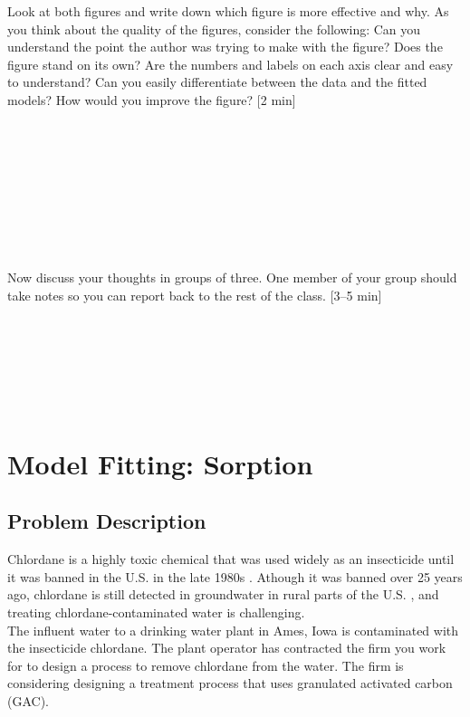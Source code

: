 \documentclass[12pt,letterpaper]{article}
\begin{document}
Look at both figures and write down which figure is more effective and why. As you think about the quality of the figures, consider the following: Can you understand the point the author was trying to make with the figure? Does the figure stand on its own?  Are the numbers and labels on each axis clear and easy to understand?  Can you easily differentiate between the data and the fitted models? How would you improve the figure? [2 min]\\\\\\\\\\\\\\\\\\\\

Now discuss your thoughts in groups of three. One member of your group should take notes so you can report back to the rest of the class. [3--5 min] \\\\\\\\\\\\\\

\section *{Model Fitting: Sorption}

\subsection *{Problem Description}
Chlordane is a highly toxic chemical that was used widely as an insecticide until it was banned in the U.S. in the late 1980s \cite{army2009}.  Athough it was banned over 25 years ago, chlordane is still detected in groundwater in rural parts of the U.S. \cite{bidel2004}, and treating chlordane-contaminated water is challenging.\\

The influent water to a drinking water plant in Ames, Iowa is contaminated with the insecticide chlordane. The plant operator has contracted the firm you work for to design a  process to remove chlordane from the water. The firm is considering designing a treatment process that uses granulated activated carbon (GAC).\\
\end{document}
